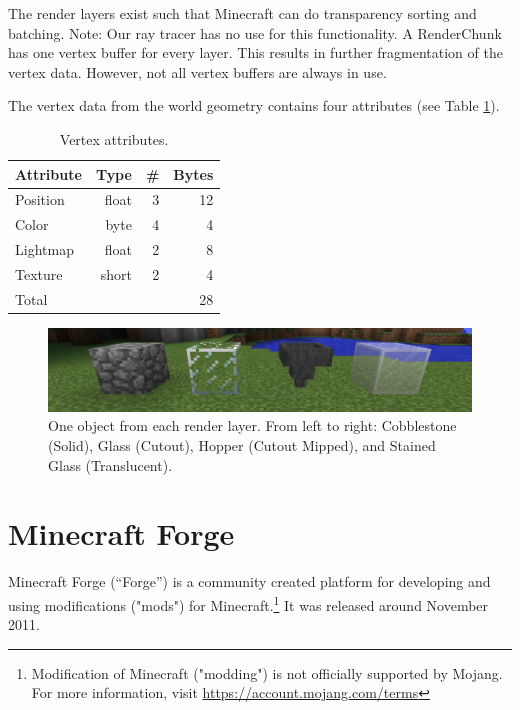 \documentclass[]{article}
\begin{document}
The render layers exist such that Minecraft can do transparency sorting and batching.
Note: Our ray tracer has no use for this functionality.
A RenderChunk has one vertex buffer for every layer.
This results in further fragmentation of the vertex data.
However, not all vertex buffers are always in use.

The vertex data from the world geometry contains four attributes (see Table \ref{tbl:vertex}).

\begin{table}
  \centering
  \begin{tabular}{|l|r|r|r|} \hline
    Attribute & Type & \# & Bytes\\ \hline
    Position & float & 3 & 12 \\ \hline
    Color & byte & 4 & 4 \\ \hline
    Lightmap & float & 2 & 8 \\ \hline
    Texture & short & 2 & 4 \\ \hline \hline
    \multicolumn{3}{|l|}{Total} & 28 \\ \hline
  \end{tabular}
  \caption{Vertex attributes.}
  \label{tbl:vertex}
\end{table}

\begin{figure}
  \includegraphics[width=\textwidth]{ss-layers.png}
  \centering
  \caption[One object from each render layer]{One object from each render layer. From left to right: Cobblestone (Solid), Glass (Cutout), Hopper (Cutout Mipped), and Stained Glass (Translucent).}
  \label{fig:ss-layers}
\end{figure}

\section{Minecraft Forge}
Minecraft Forge (\enquote{Forge}) is a community created platform for developing and using modifications ("mods") for Minecraft.\footnote{Modification of Minecraft ("modding") is not officially supported by Mojang. For more information, visit \url{https://account.mojang.com/terms}}
It was released around November 2011.
\end{document}
